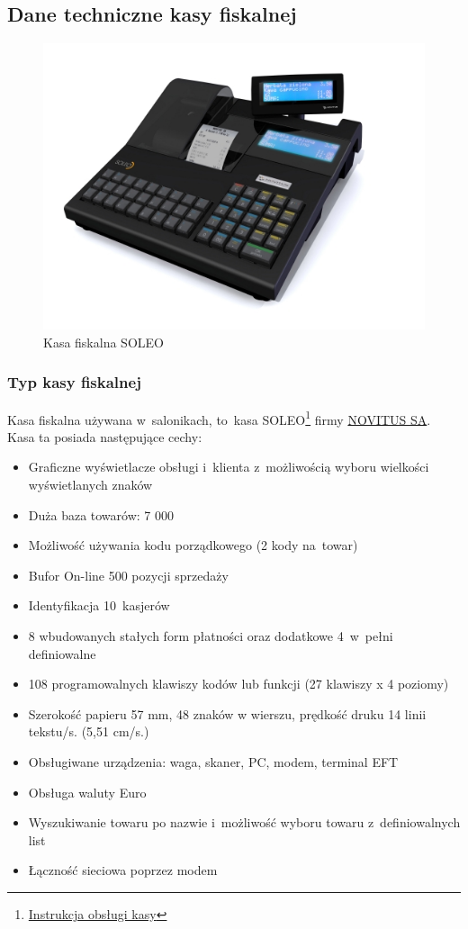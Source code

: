 \subsection{Dane techniczne kasy fiskalnej}
\begin{figure}
\includegraphics[width=1\textwidth]{gfx/SOLENO.jpg}
\caption{Kasa fiskalna SOLEO}
\end{figure}
\subsubsection{Typ kasy fiskalnej}
\begin{description}

\item Kasa fiskalna używana w~salonikach, to~kasa SOLEO\footnote{\href{http://www.novitus.pl/pl/cok/download/instrukcje-obslugi/instr_obslugi_soleo_v18.pdf} {Instrukcja obsługi kasy}}  firmy \href{http://www.novitus.pl/pl} {NOVITUS SA}. Kasa ta posiada następujące cechy:	
\begin{itemize}
\item Graficzne wyświetlacze obsługi i~klienta z~możliwością wyboru wielkości wyświetlanych znaków
\item Duża baza towarów: 7 000
\item Możliwość używania kodu porządkowego (2 kody na~towar)
\item Bufor On-line 500 pozycji sprzedaży
\item Identyfikacja 10~kasjerów
\item 8 wbudowanych stałych form płatności oraz dodatkowe 4~w~pełni definiowalne
\item 108 programowalnych klawiszy kodów lub funkcji (27 klawiszy x 4 poziomy)
\item Szerokość papieru 57 mm, 48 znaków w wierszu, prędkość druku 14 linii tekstu/s. (5,51 cm/s.)
\item Obsługiwane urządzenia: waga, skaner, PC, modem, terminal EFT
\item Obsługa waluty Euro
\item Wyszukiwanie towaru po nazwie i~możliwość wyboru towaru z~definiowalnych list
\item Łączność sieciowa poprzez modem
\end{itemize} 
\end{description}
